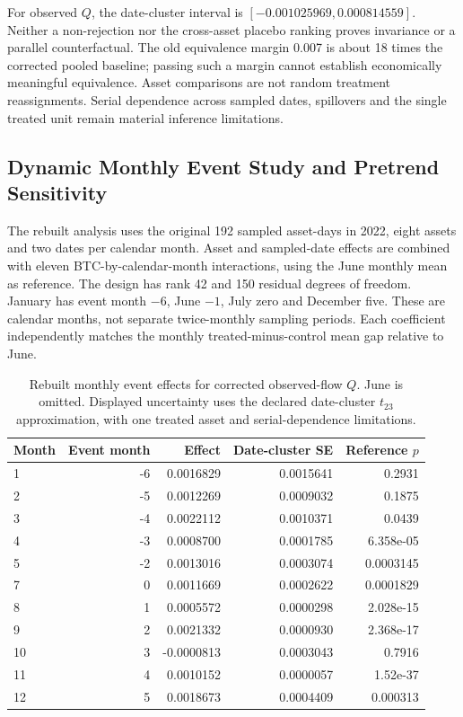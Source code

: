\documentclass[12pt]{article}
\theoremstyle{definition}
\theoremstyle{remark}
\begin{document}
For observed $Q$, the date-cluster interval is $[-0.001025969,0.000814559]$. Neither a non-rejection nor the cross-asset placebo ranking proves invariance or a parallel counterfactual. The old equivalence margin 0.007 is about 18 times the corrected pooled baseline; passing such a margin cannot establish economically meaningful equivalence. Asset comparisons are not random treatment reassignments. Serial dependence across sampled dates, spillovers and the single treated unit remain material inference limitations.
\subsection{Dynamic Monthly Event Study and Pretrend Sensitivity}
The rebuilt analysis uses the original 192 sampled asset-days in 2022, eight assets and two dates per calendar month. Asset and sampled-date effects are combined with eleven BTC-by-calendar-month interactions, using the June monthly mean as reference. The design has rank 42 and 150 residual degrees of freedom. January has event month $-6$, June $-1$, July zero and December five. These are calendar months, not separate twice-monthly sampling periods. Each coefficient independently matches the monthly treated-minus-control mean gap relative to June.

\begin{table}[htbp]
\centering\footnotesize
\caption{Rebuilt monthly event effects for corrected observed-flow $Q$. June is omitted. Displayed uncertainty uses the declared date-cluster $t_{23}$ approximation, with one treated asset and serial-dependence limitations.}
\label{tab:dynamic_event_study}
\begin{tabular}{lrrrr}\toprule
Month & Event month & Effect & Date-cluster SE & Reference $p$ \\\midrule
1 & -6 & 0.0016829 & 0.0015641 & 0.2931 \\
2 & -5 & 0.0012269 & 0.0009032 & 0.1875 \\
3 & -4 & 0.0022112 & 0.0010371 & 0.0439 \\
4 & -3 & 0.0008700 & 0.0001785 & 6.358e-05 \\
5 & -2 & 0.0013016 & 0.0003074 & 0.0003145 \\
7 & 0 & 0.0011669 & 0.0002622 & 0.0001829 \\
8 & 1 & 0.0005572 & 0.0000298 & 2.028e-15 \\
9 & 2 & 0.0021332 & 0.0000930 & 2.368e-17 \\
10 & 3 & -0.0000813 & 0.0003043 & 0.7916 \\
11 & 4 & 0.0010152 & 0.0000057 & 1.52e-37 \\
12 & 5 & 0.0018673 & 0.0004409 & 0.000313 \\
\bottomrule\end{tabular}
\end{table}
\end{document}
